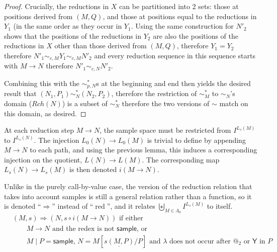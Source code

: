 \documentclass{article}
\newcommand{\tY}{\textsf{Y}}
\newcommand{\tsample}{\textsf{sample}}
\DeclareMathOperator{\red}{red}
\theoremstyle{definition}
\theoremstyle{lemma}
\theoremstyle{remark}
\begin{document}
\begin{proof}
Crucially, the reductions in $X$ can be partitioned into 2 sets: those at positions derived from $(M,Q)$, and those at positions equal to the reductions in $Y_1$ (in the same order as they occur in $Y_1$. Using the same construction for $N'_2$ shows that the positions of the reductions in $Y_2$ are also the positions of the reductions in $X$ other than those derived from $(M,Q)$, therefore $Y_1 = Y_2$ therefore $N'_1 \sim_{c,M} Y_1 \sim_{c,M} N'_2$ and every reduction sequence in this sequence starts with $M \to N$ therefore $N'_1 \sim_{c,N} N'_2$.

Combining this with the $\sim_{p,N}^*$s at the beginning and end then yields the desired result that $(N_1,P_1) \sim_N^* (N_2, P_2)$, therefore the restriction of $\sim_M^*$ to $\sim_N$'s domain ($Rch(N)$) is a subset of $\sim_N^*$ therefore the two versions of $\sim$ match on this domain, as desired.
\end{proof}


At each reduction step $M \to N$, the sample space must be restricted from $I^{L_s(M)}$ to $I^{L_s(N)}$. The injection $L_0(N) \to L_0(M)$ is trivial to define by appending $M \to N$ to each path, and using the previous lemma, this induces a corresponding injection on the quotient, $L(N) \to L(M)$. The corresponding map $L_s(N) \to L_s(M)$ is then denoted $i(M \to N)$.

Unlike in the purely call-by-value case, the version of the reduction relation that takes into account samples is still a general relation rather than a function, so it is denoted ``$\Rightarrow$'' instead of ``$\red$'', and it relates $\biguplus_{M \in \Lambda_0} I^{L_s(M)}$ to itself.
\begin{align*}
& (M,s) \Rightarrow (N,s \circ i(M \to N)) \text{ if either} \\
& \qquad \text{$M \to N$ and the redex is not $\tsample$, or} \\
& \qquad \text{$M \mid P = \tsample$, $N = M[\underline{s(M,P)}/P]$ and $\lambda$ does not occur after $@_2$ or $\tY$ in $P$}
\end{align*}
\end{document}
